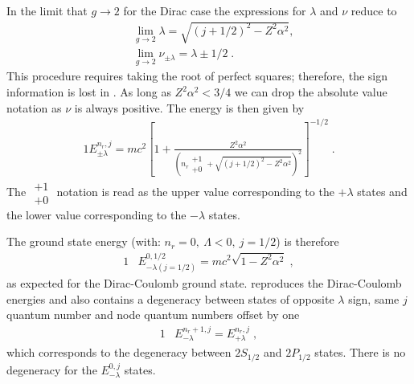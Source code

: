 In the limit that $g\rightarrow2$ for the Dirac case the expressions for $\lambda$ and $\nu$ reduce to
\begin{subequations}
\begin{alignat}{1}
\label{glimit01} &\lim_{g\rightarrow2}\lambda=\sqrt{\displaystyle(j+1/2)^{2}-Z^{2}\alpha^{2}},\\
&\lim_{g\rightarrow2}\nu_{\pm\lambda}=\lambda\pm1/2\;.
\end{alignat}
\end{subequations}
This procedure requires taking the root of perfect squares; therefore, the sign information is lost in . As long as $Z^{2}\alpha^{2}<3/4$ we can drop the absolute value notation as $\nu$ is always positive. The energy is then given by
\begin{alignat}{1}
\label{glimit02}
E_{\pm\lambda}^{n_{r},j}=mc^{2}\left[1+\displaystyle\frac{Z^{2}\alpha^{2}}{\left(n_{r}\begin{smallmatrix} +1 \\ +0 \end{smallmatrix}+\sqrt{\displaystyle(j+1/2)^{2}-Z^{2}\alpha^{2}}\right)^{2}}\right]^{-1/2}\;.
\end{alignat}
The $\begin{smallmatrix} +1 \\ +0 \end{smallmatrix}$ notation is read as the upper value corresponding to the $+\lambda$ states and the lower value corresponding to the $-\lambda$ states. 

The ground state energy (with: $n_{r}=0,\ \Lambda<0,\ j=1/2$) is therefore
\begin{alignat}{1}
\label{glimit07} &E^{0,1/2}_{-\lambda(j=1/2)}=mc^{2}\sqrt{1-Z^{2}\alpha^{2}}\;,\end{alignat}
as expected for the Dirac-Coulomb ground state.  reproduces the Dirac-Coulomb energies and also contains a degeneracy between states of opposite $\lambda$ sign, same $j$ quantum number and node quantum numbers offset by one
\begin{alignat}{1}
\label{glimit03} &E^{n_{r}+1,j}_{-\lambda}=E^{n_{r},j}_{+\lambda}\;,\end{alignat}
which corresponds to the degeneracy between $2S_{1/2}$ and $2P_{1/2}$ states. There is no degeneracy for the $E^{0,j}_{-\lambda}$ states. 

